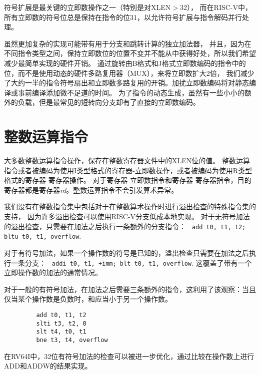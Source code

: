 \begin{commentary}
符号扩展是最关键的立即数操作之一（特别是对XLEN$>$32），
而在RISC-V中，所有立即数的符号位总是保持在指令的位31，以允许符号扩展与指令解码并行处理。

虽然更加复杂的实现可能带有用于分支和跳转计算的独立加法器，
并且，因为在不同指令类型之间，保持立即数位的位置不变并不能从中获得好处，所以我们希望减少最简单实现的硬件开销。
通过旋转由B格式和J格式立即数编码的指令中的位，而不是使用动态的硬件多路复用器（MUX），来将立即数扩大2倍，
我们减少了大约一半的指令符号扇出和立即数多路复用的开销。加扰立即数编码将对静态编译或事前编译添加微不足道的时间。
为了指令的动态生成，虽然有一些小小的额外的负载，但是最常见的短转向分支却有了直接的立即数编码。
\end{commentary}

\section{整数运算指令}

大多数整数运算指令操作，保存在整数寄存器文件中的XLEN位的值。
整数运算指令或者被编码为使用I类型格式的寄存器-立即数操作，或者被编码为使用R类型格式的寄存器-寄存器操作。
对于寄存器-立即数指令和寄存器-寄存器指令，目的寄存器都是寄存器{\em rd}。整数运算指令不会引发算术异常。

\begin{commentary}
我们没有在整数指令集中包括对于在整数算术操作时进行溢出检查的特殊指令集的支持，
因为许多溢出检查可以使用RISC-V分支低成本地实现。
对于无符号加法的溢出检查，只需要在加法之后执行一条额外的分支指令：
\verb! add t0, t1, t2; bltu t0, t1, overflow!.

对于有符号加法，如果一个操作数的符号是已知的，溢出检查只需要在加法之后执行一条分支：
\verb! addi t0, t1, +imm; blt t0, t1, overflow!.  
这覆盖了带有一个立即操作数的加法的通常情况。

对于一般的有符号加法，在加法之后需要三条额外的指令，这利用了该观察：当且仅当某个操作数是负数时，和应当小于另一个操作数。
\begin{verbatim}
         add t0, t1, t2
         slti t3, t2, 0
         slt t4, t0, t1
         bne t3, t4, overflow
\end{verbatim}
在RV64I中，32位有符号加法的检查可以被进一步优化，通过比较在操作数上进行ADD和ADDW的结果实现。
\end{commentary}

